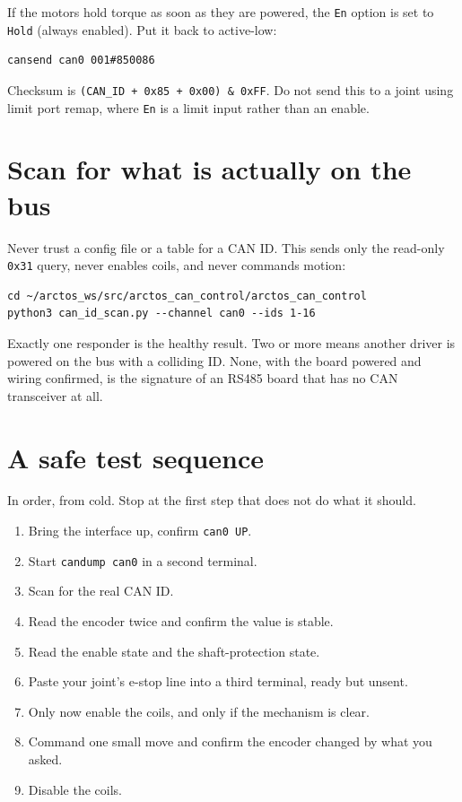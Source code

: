 \documentclass[11pt,letterpaper]{article}
\begin{document}
If the motors hold torque as soon as they are powered, the \texttt{En} option is
set to \texttt{Hold} (always enabled). Put it back to active-low:

\begin{lstlisting}
cansend can0 001#850086
\end{lstlisting}

Checksum is \texttt{(CAN\_ID + 0x85 + 0x00) \& 0xFF}. Do not send this to a joint
using limit port remap, where \texttt{En} is a limit input rather than an enable.

\section{Scan for what is actually on the bus}

Never trust a config file or a table for a CAN ID. This sends only the read-only
\texttt{0x31} query, never enables coils, and never commands motion:

\begin{lstlisting}
cd ~/arctos_ws/src/arctos_can_control/arctos_can_control
python3 can_id_scan.py --channel can0 --ids 1-16
\end{lstlisting}

Exactly one responder is the healthy result. Two or more means another driver is
powered on the bus with a colliding ID. None, with the board powered and wiring
confirmed, is the signature of an RS485 board that has no CAN transceiver at all.

\section{A safe test sequence}

In order, from cold. Stop at the first step that does not do what it should.

\begin{enumerate}[leftmargin=*]
    \item Bring the interface up, confirm \texttt{can0 UP}.
    \item Start \texttt{candump can0} in a second terminal.
    \item Scan for the real CAN ID.
    \item Read the encoder twice and confirm the value is stable.
    \item Read the enable state and the shaft-protection state.
    \item Paste your joint's e-stop line into a third terminal, ready but unsent.
    \item Only now enable the coils, and only if the mechanism is clear.
    \item Command one small move and confirm the encoder changed by what you asked.
    \item Disable the coils.
\end{enumerate}
\end{document}
